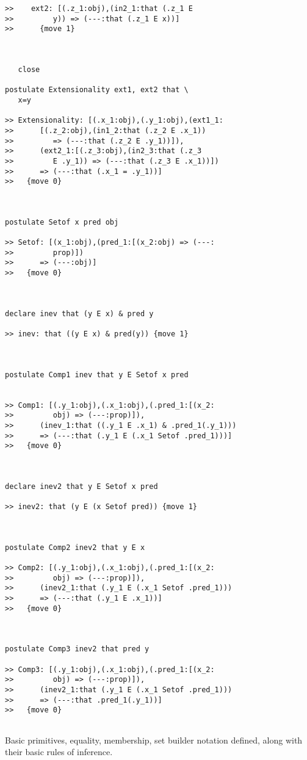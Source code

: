 \documentclass{article}
\begin{document}
\begin{verbatim}
>>    ext2: [(.z_1:obj),(in2_1:that (.z_1 E
>>         y)) => (---:that (.z_1 E x))]
>>      {move 1}



   close

postulate Extensionality ext1, ext2 that \
   x=y

>> Extensionality: [(.x_1:obj),(.y_1:obj),(ext1_1:
>>      [(.z_2:obj),(in1_2:that (.z_2 E .x_1))
>>         => (---:that (.z_2 E .y_1))]),
>>      (ext2_1:[(.z_3:obj),(in2_3:that (.z_3
>>         E .y_1)) => (---:that (.z_3 E .x_1))])
>>      => (---:that (.x_1 = .y_1))]
>>   {move 0}



postulate Setof x pred obj

>> Setof: [(x_1:obj),(pred_1:[(x_2:obj) => (---:
>>         prop)])
>>      => (---:obj)]
>>   {move 0}



declare inev that (y E x) & pred y

>> inev: that ((y E x) & pred(y)) {move 1}



postulate Comp1 inev that y E Setof x pred


>> Comp1: [(.y_1:obj),(.x_1:obj),(.pred_1:[(x_2:
>>         obj) => (---:prop)]),
>>      (inev_1:that ((.y_1 E .x_1) & .pred_1(.y_1)))
>>      => (---:that (.y_1 E (.x_1 Setof .pred_1)))]
>>   {move 0}



declare inev2 that y E Setof x pred

>> inev2: that (y E (x Setof pred)) {move 1}



postulate Comp2 inev2 that y E x

>> Comp2: [(.y_1:obj),(.x_1:obj),(.pred_1:[(x_2:
>>         obj) => (---:prop)]),
>>      (inev2_1:that (.y_1 E (.x_1 Setof .pred_1)))
>>      => (---:that (.y_1 E .x_1))]
>>   {move 0}



postulate Comp3 inev2 that pred y

>> Comp3: [(.y_1:obj),(.x_1:obj),(.pred_1:[(x_2:
>>         obj) => (---:prop)]),
>>      (inev2_1:that (.y_1 E (.x_1 Setof .pred_1)))
>>      => (---:that .pred_1(.y_1))]
>>   {move 0}


\end{verbatim}

Basic primitives, equality, membership, set builder notation defined, along with their basic rules of inference.
\end{document}
